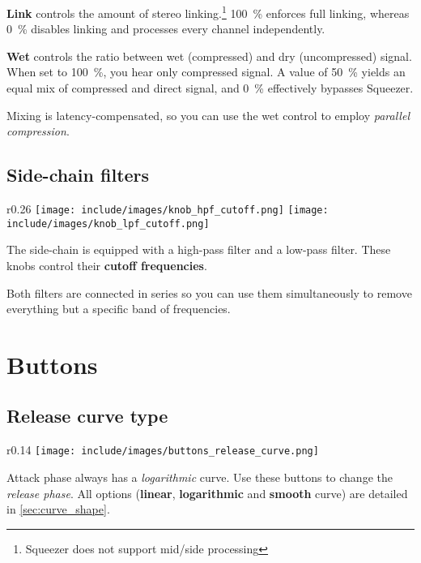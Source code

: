 \textbf{Link} controls the amount of stereo linking.\footnote{Squeezer
  does not support mid/side processing} \SI{100}{\percent} enforces
full linking, whereas \SI{0}{\percent} disables linking and processes
every channel independently.

\textbf{Wet} controls the ratio between wet (compressed) and dry
(uncompressed) signal.  When set to \SI{100}{\percent}, you hear only
compressed signal.  A value of \SI{50}{\percent} yields an equal mix
of compressed and direct signal, and \SI{0}{\percent} effectively
bypasses Squeezer.

Mixing is latency-compensated, so you can use the wet control to
employ \emph{parallel compression}.

\section{Side-chain filters}

\begin{wrapfigure}{r}{0.26\linewidth}
  \texttt{[image: include/images/knob\_hpf\_cutoff.png]}
  \texttt{[image: include/images/knob\_lpf\_cutoff.png]}
\end{wrapfigure}

The side-chain is equipped with a high-pass filter and a low-pass
filter.  These knobs control their \textbf{cutoff frequencies}.

Both filters are connected in series so you can use them
simultaneously to remove everything but a specific band of
frequencies.

\chapter{Buttons}
\label{sec:buttons}

\section{Release curve type}

\begin{wrapfigure}{r}{0.14\linewidth}
  \texttt{[image: include/images/buttons\_release\_curve.png]}
\end{wrapfigure}

Attack phase always has a \emph{logarithmic} curve.  Use these buttons
to change the \emph{release phase}.  All options (\textbf{linear},
\textbf{logarithmic} and \textbf{smooth} curve) are detailed in
\ref{sec:curve_shape}.

